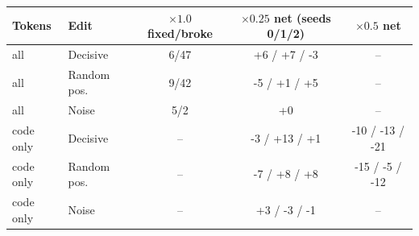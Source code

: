 \begin{tabular}{llccc}
\toprule
Tokens & Edit & $\times1.0$ fixed/broke & $\times0.25$ net (seeds 0/1/2) & $\times0.5$ net \\
\midrule
all & Decisive & 6/47 & +6 / +7 / -3 & -- \\
all & Random pos. & 9/42 & -5 / +1 / +5 & -- \\
all & Noise & 5/2 & +0 & -- \\
\midrule
code only & Decisive & -- & -3 / +13 / +1 & -10 / -13 / -21 \\
code only & Random pos. & -- & -7 / +8 / +8 & -15 / -5 / -12 \\
code only & Noise & -- & +3 / -3 / -1 & -- \\
\bottomrule
\end{tabular}
